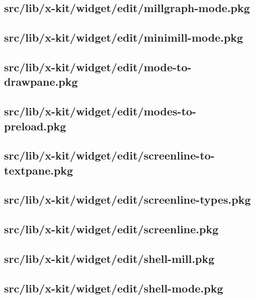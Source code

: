 \subsection{src/lib/x-kit/widget/edit/millgraph-mode.pkg}


\subsection{src/lib/x-kit/widget/edit/minimill-mode.pkg}


\subsection{src/lib/x-kit/widget/edit/mode-to-drawpane.pkg}


\subsection{src/lib/x-kit/widget/edit/modes-to-preload.pkg}


\subsection{src/lib/x-kit/widget/edit/screenline-to-textpane.pkg}


\subsection{src/lib/x-kit/widget/edit/screenline-types.pkg}


\subsection{src/lib/x-kit/widget/edit/screenline.pkg}


\subsection{src/lib/x-kit/widget/edit/shell-mill.pkg}


\subsection{src/lib/x-kit/widget/edit/shell-mode.pkg}


